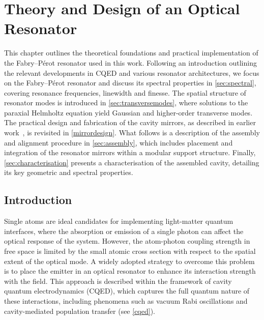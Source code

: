 \documentclass[../Thesis-IJspeert.tex]{subfiles}
\begin{document}
\graphicspath{ {"Theory and Design of an Optical Resonator/figs/"} }

\chapter[Theory and Design of an Optical Resonator]{Theory and Design of\hspace{2em} an Optical Resonator}
\label{chap:TheoryandDesignofanOpticalResonator}
This chapter outlines the theoretical foundations and practical implementation of the Fabry--Pérot resonator used in this work. Following an introduction outlining the relevant developments in CQED and various resonator architectures, we focus on the Fabry--Pérot resonator and discuss its spectral properties in \autoref{sec:spectral}, covering resonance frequencies, linewidth and finesse. The spatial structure of resonator modes is introduced in \autoref{sec:transversemodes}, where solutions to the paraxial Helmholtz equation yield Gaussian and higher-order transverse modes. The practical design and fabrication of the cavity mirrors, as described in earlier work~\cite{doherty2021a}, is revisited in \autoref{mirrordesign}. What follows is a description of the assembly and alignment procedure in \autoref{sec:assembly}, which includes placement and integration of the resonator mirrors within a modular support structure. Finally, \autoref{sec:characterisation} presents a characterisation of the assembled cavity, detailing its key geometric and spectral properties.

\section{Introduction}
Single atoms are ideal candidates for implementing light-matter quantum interfaces, where the absorption or emission of a single photon can affect the optical response of the system. However, the atom-photon coupling strength in free space is limited by the small atomic cross section with respect to the spatial extent of the optical mode. A widely adopted strategy to overcome this problem is to place the emitter in an optical resonator to enhance its interaction strength with the field. This approach is described within the framework of cavity quantum electrodynamics (CQED), which captures the full quantum nature of these interactions, including phenomena such as vacuum Rabi oscillations and cavity-mediated population transfer (see \autoref{cqed}).
\end{document}
